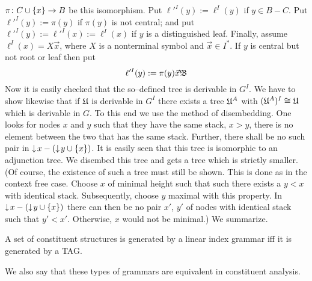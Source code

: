 $\pi \colon C \cup \{x\} \rightarrow B$ be this isomorphism.
Put $\ell'^I(y) := \ell^I(y)$ if $y \in B - C$.
Put $\ell'^I(y) := \pi(y)$ if $\pi(y)$ is not central;
and put $\ell'^I(y) := \ell'^I(x) := \ell^I(x)$ if
$y$ is a distinguished leaf. Finally, assume
$\ell^I(x) = X\vec{x}$, where $X$ is a nonterminal symbol
and $\vec{x} \in I^{\ast}$. If $y$ is central but not
root or leaf then put
\begin{equation}
\ell'^I(y) := \pi(y)\vec{x}\mathfrak{B}
\end{equation}
Now it is easily checked that the so--defined tree
is derivable in $G^I$. We have to show likewise
that if $\mathfrak{U}$ is derivable in $G^I$ there exists a tree
$\mathfrak{U}^A$ with $(\mathfrak{U}^A)^I \cong \mathfrak{U}$ which is derivable in $G$.
To this end we use the method of disembedding. One looks
for nodes $x$ and $y$ such that they have the same stack,
$x > y$, there is no element between the two that has
the same stack. Further, there shall be no such pair in
${\downarrow\! x} - ({\downarrow\! y} \cup \{x\})$. It is easily seen that 
this tree is isomorphic to an adjunction tree. We disembed 
this tree and gets a tree which is strictly smaller. (Of 
course, the existence of such a tree must still be shown. 
This is done as in the context free case. Choose
$x$ of minimal height such that such there exists a $y < x$
with identical stack. Subsequently, choose $y$ maximal with
this property. In ${\downarrow\! x} - ({\downarrow\! y} \cup \{x\})$ there can
then be no pair $x'$, $y'$ of nodes with identical stack such
that $y' < x'$. Otherwise, $x$ would not be minimal.) We
summarize.
\begin{thm}
A set of constituent structures is generated by a linear index
grammar iff it is generated by a TAG.
\end{thm}
We also say that these types of grammars are equivalent in
constituent analysis.

